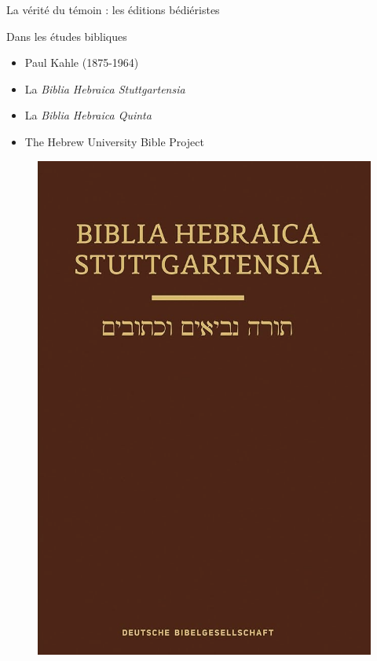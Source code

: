 \documentclass[11pt]{beamer}
\begin{document}
\begin{frame}{La vérité du témoin : les éditions bédiéristes}
\begin{minipage}{.45\textwidth}
\begin{block}{Dans les études bibliques}
\begin{itemize}
        \item Paul Kahle (1875-1964)
        \item La \textit{Biblia Hebraica Stuttgartensia}
        \item La \textit{Biblia Hebraica Quinta}
        \item The Hebrew University Bible Project
\end{itemize}
\end{block}
\end{minipage}
\hfill
\begin{minipage}{.5\textwidth}
    \begin{figure}
    \centering
    \includegraphics[width=1\linewidth]{img/bhs_cover.png}
    \end{figure} 
\end{minipage}
\end{frame}
\end{document}
